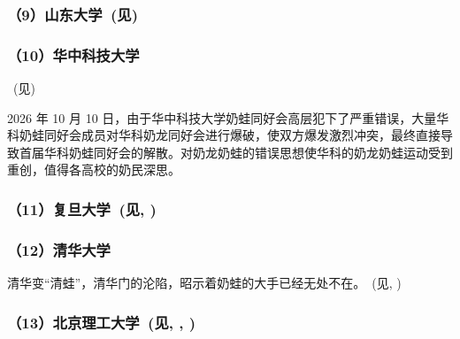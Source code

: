 

\subsubsection[（9）山东大学]{（9）山东大学~(见)}



\clearpage
\subsubsection{（10）华中科技大学}~(见)



2026 年 10 月 10 日，由于华中科技大学奶蛙同好会高层犯下了严重错误，大量华科奶蛙同好会成员对华科奶龙同好会进行爆破，使双方爆发激烈冲突，最终直接导致首届华科奶蛙同好会的解散。对奶龙奶蛙的错误思想使华科的奶龙奶蛙运动受到重创，值得各高校的奶民深思。

\subsubsection[（11）复旦大学]{（11）复旦大学~(见, )}





\clearpage
\subsubsection{（12）清华大学}

清华变“清蛙”，清华门的沦陷，昭示着奶蛙的大手已经无处不在。~(见, )





\subsubsection[（13）北京理工大学]{（13）北京理工大学~(见, , )}



\clearpage


